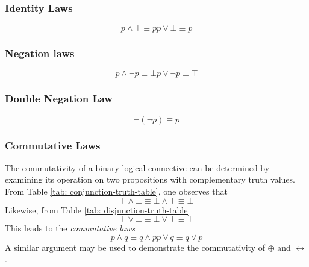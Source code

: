 \documentclass[twocolumn]{report}
\begin{document}
\subsubsection{Identity Laws}
\begin{subequations}
\begin{equation}
	p \wedge \top \equiv p
	\label{eqn: conjunction-identity-law}
\end{equation}
\begin{equation}
	p \lor \bot \equiv p
	\label{eqn: disjuction-identity-law}
\end{equation}
\end{subequations}
\subsubsection{Negation laws}
\begin{subequations}
	\begin{equation}
		p \wedge \neg p \equiv \bot
		\label{eqn: conjunction-negation-law}
	\end{equation}
	\begin{equation}
		p \lor \neg p \equiv \top
		\label{eqn: disjunction-negation-law}
	\end{equation}
\end{subequations}
\subsubsection{Double Negation Law}
\begin{subequations}
	\begin{equation}
		\neg (\neg p) \equiv p
		\label{eqn: double-negation-law}
	\end{equation}
\end{subequations}
\subsubsection{Commutative Laws}
The commutativity of a binary logical connective can be determined by examining its operation on two propositions with complementary truth values. 
From Table \ref{tab: conjunction-truth-table}, one observes that
\[
	\top \wedge \bot \equiv \bot \wedge \top \equiv \bot
\]
Likewise, from Table \ref{tab: disjunction-truth-table}
\[
	\top \lor \bot \equiv \bot \lor \top \equiv \top
\]
This leads to the \textit{commutative laws}
\begin{subequations}
	\begin{equation}
		p \wedge q \equiv q \wedge p
		\label{eqn: conjunction-commutative-law}
	\end{equation}
	\begin{equation}
		p \lor q \equiv q \lor p
		\label{eqn: disjunction-commutative-law}
	\end{equation}
\end{subequations}
A similar argument may be used to demonstrate the commutativity of $\oplus$ and $\leftrightarrow$.
\end{document}
